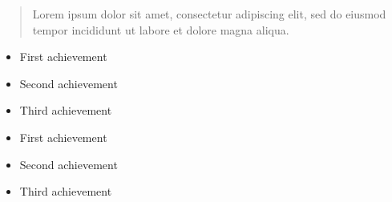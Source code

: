 \documentclass[10pt,a4paper,ragged2e,withhyper]{altacv}
\begin{document}
\begin{paracol}{2}
        
        
        
        \newpage
        
        \switchcolumn
        
            \begin{quote}
                Lorem ipsum dolor sit amet, consectetur adipiscing elit, sed do eiusmod tempor incididunt ut labore et dolore magna aliqua.
            \end{quote}
        
            \begin{itemize}
                \item First achievement
                \item Second achievement
                \item Third achievement
            \end{itemize}
            \divider
            
            \begin{itemize}
                \item First achievement
                \item Second achievement
                \item Third achievement
            \end{itemize}
        

\end{paracol}
\end{document}
